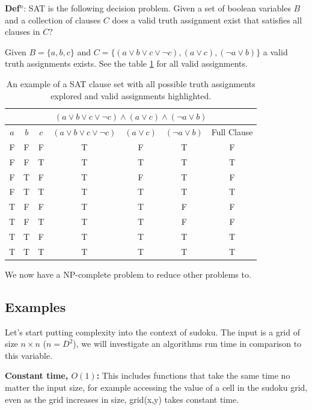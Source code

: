 \documentclass[a4paper,11pt]{report}
\newcounter{row}
\newcounter{col}
\begin{document}
\textbf{Def$^n$}: SAT is the following decision problem. Given a set of boolean variables $B$ and a collection of clauses $C$ does a valid truth assignment exist that satisfies all clauses in $C$?

Given $B = \{a,b,c\}$ and  $C=\{(a\lor b \lor c \lor \neg c), (a \lor c), (\neg a\lor b)\}$ a valid truth assignments exists. See the table \ref{satex} for all valid assignments.

\begin{table}
\begin{center}
\begin{tabular}{ |c|c|c|c|c|c|c|  }
 \hline
 \multicolumn{7}{|c|}{$(a\lor b \lor c \lor \neg c)\land (a \lor c) \land (\neg a\lor b)$} \\
 \hline
$a$ & $b$ & $c$ & $(a\lor b \lor c \lor \neg c)$ & $(a \lor c)$ & $(\neg a\lor b)$ & Full Clause\\
 \hline
 F & F & F & T & F & T & F \\
\rowcolor{lightgray}
 F & F & T & T & T & T & T \\
 F & T & F & T & F & T & F \\
\rowcolor{lightgray}
 F & T & T & T & T & T & T \\
 T & F & F & T & T & F & F \\
 T & F & T & T & T & F & F \\
\rowcolor{lightgray}
 T & T & F & T & T & T & T \\
\rowcolor{lightgray}
 T & T & T & T & T & T & T \\
 \hline
\end{tabular}
\end{center}
\caption{\label{satex}An example of a SAT clause set with all possible truth assignments explored and valid assignments highlighted.}
\end{table}

We now have a NP-complete problem to reduce other problems to.

\subsection{Examples}

Let's start putting complexity into the context of sudoku. The input is a grid of size $n\times n$ ($n=D^2$), we will investigate an algorithms run time in comparison to this variable.

\textbf{Constant time, $O(1)$:} This includes functions that take the same time no matter the input size, for example accessing the value of a cell in the sudoku grid, even as the grid increases in size, grid(x,y) takes constant time.
\end{document}
